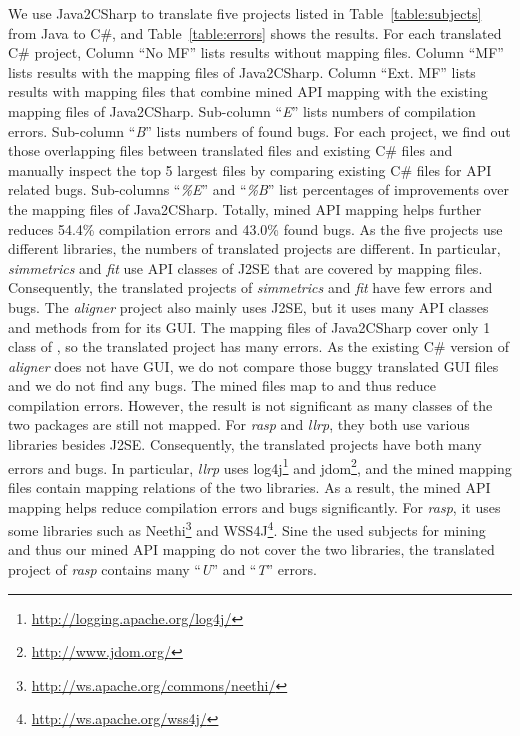 We use Java2CSharp to translate five projects listed in
Table~\ref{table:subjects} from Java to C\#, and
Table~\ref{table:errors} shows the results. For each translated C\#
project, Column ``No MF'' lists results without mapping files.
Column ``MF'' lists results with the mapping files of Java2CSharp.
Column ``Ext. MF'' lists results with mapping files that combine
mined API mapping with the existing mapping files of Java2CSharp.
Sub-column ``\emph{E}'' lists numbers of compilation errors.
Sub-column ``\emph{B}'' lists numbers of found bugs. For each
project, we find out those overlapping files between translated
files and existing C\# files and manually inspect the top 5 largest
files by comparing existing C\# files for API related bugs.
Sub-columns ``\emph{\%E}'' and ``\emph{\%B}'' list percentages of
improvements over the mapping files of Java2CSharp. Totally, mined
API mapping helps further reduces 54.4\% compilation errors and
43.0\% found bugs. As the five projects use different libraries, the
numbers of translated projects are different. In particular,
\emph{simmetrics} and \emph{fit} use API classes of J2SE that are
covered by mapping files. Consequently, the translated projects of
\emph{simmetrics} and \emph{fit} have few errors and bugs. The
\emph{aligner} project also mainly uses J2SE, but it uses many API
classes and methods from  for its GUI. The mapping
files of Java2CSharp cover only 1 class of , so the
translated project has many errors. As the existing C\# version of
\emph{aligner} does not have GUI, we do not compare those buggy
translated GUI files and we do not find any bugs. The mined files
map  to  and thus
reduce compilation errors. However, the result is not significant as
many classes of the two packages are still not mapped. For
\emph{rasp} and \emph{llrp}, they both use various libraries besides
J2SE. Consequently, the translated projects have both many errors
and bugs. In particular, \emph{llrp} uses
log4j\footnote{\url{http://logging.apache.org/log4j/}} and
jdom\footnote{\url{http://www.jdom.org/}}, and the mined mapping
files contain mapping relations of the two libraries. As a result,
the mined API mapping helps reduce compilation errors and bugs
significantly. For \emph{rasp}, it uses some libraries such as
Neethi\footnote{\url{http://ws.apache.org/commons/neethi/}} and
WSS4J\footnote{\url{http://ws.apache.org/wss4j/}}. Sine the used
subjects for mining and thus our mined API mapping do not cover the
two libraries, the translated project of \emph{rasp} contains many
``\emph{U}'' and ``\emph{T}'' errors.

